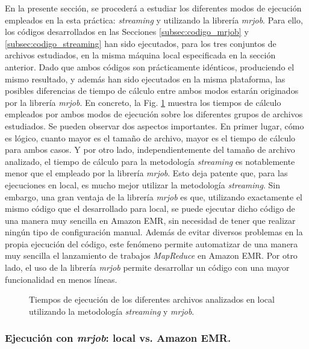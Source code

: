 \documentclass[10pt, spanish]{article}
\begin{document}
En la presente sección, se procederá a estudiar los diferentes modos de ejecución empleados en la esta práctica: \textit{streaming} y utilizando la librería \textit{mrjob}. Para ello, los códigos desarrollados en las Secciones \ref{subsec:codigo_mrjob} y \ref{subsec:codigo_streaming} han sido ejecutados, para los tres conjuntos de archivos estudiados, en la misma máquina local especificada en la sección anterior. Dado que ambos códigos son prácticamente idénticos, produciendo el mismo resultado, y además han sido ejecutados en la misma plataforma, las posibles diferencias de tiempo de cálculo entre ambos modos estarán originados por la librería \textit{mrjob}. En concreto, la Fig. \ref{fig:ExeLocal} muestra los tiempos de cálculo empleados por ambos modos de ejecución sobre los diferentes grupos de archivos estudiados. Se pueden observar dos aspectos importantes. En primer lugar, cómo es lógico, cuanto mayor es el tamaño de archivo, mayor es el tiempo de cálculo para ambos casos. Y por otro lado, independientemente del tamaño de archivo analizado, el tiempo de cálculo para la metodología \textit{streaming} es notablemente menor que el empleado por la librería \textit{mrjob}. Esto deja patente que, para las ejecuciones en local, es mucho mejor utilizar la metodología \textit{streaming}. Sin embargo, una gran ventaja de la librería \textit{mrjob} es que, utilizando exactamente el mismo código que el desarrollado para local, se puede ejecutar dicho código de una manera muy sencilla en Amazon EMR, sin necesidad de tener que realizar ningún tipo de configuración manual. Además de evitar diversos problemas en la propia ejecución del código, este fenómeno permite automatizar de una manera muy sencilla el lanzamiento de trabajos \textit{MapReduce} en Amazon EMR. Por otro lado, el uso de la librería \textit{mrjob} permite desarrollar un código con una mayor funcionalidad en menos líneas.

\begin{figure}[H]
\begin{center}
\caption{\label{fig:ExeLocal}Tiempos de ejecución de los diferentes archivos analizados en local utilizando la metodología \textit{streaming} y \textit{mrjob}.}
\end{center}
\end{figure}

\subsubsection{Ejecución con \textit{mrjob}: local vs. Amazon EMR.}
\end{document}
